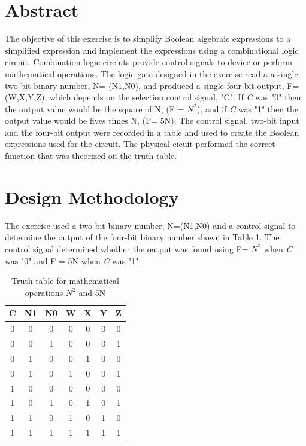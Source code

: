 \documentclass[CMPE]{KGCOEReport}
\begin{document}
\maketitle

\section*{Abstract}
The objective of this exercise is to simplify Boolean algebraic expressions to a simplified expression and implement the expressions using a combinational logic circuit. Combination logic circuits provide control signals to device or perform mathematical operations. The logic gate designed in the exercise read a a single two-bit binary number, N= (N1,N0), and produced a single four-bit output, F=(W,X,Y,Z), which depends on the selection control signal, "C". If \textit{C} was "0" then the output value would be the square of N,  (F = $N^2$), and if \textit{C} was "1" then the output value would be fives times N, (F= 5N). The control signal, two-bit input and the four-bit output were recorded in a table and used to create the Boolean expressions used for the circuit. The physical cicuit performed the correct function that was theorized on the truth table.
\section*{Design Methodology}
The exercise used a two-bit binary number, N=(N1,N0) and a control signal to determine the output of the four-bit binary number shown in Table 1. The control signal determined whether the output was found using F= $N^2$ when \textit{C} was "0" and F = 5N when \textit{C} was "1".
\begin{table}[H]
	\centering
	\caption{Truth table for mathematical operations $N^2$ and 5N}
	\label{tab:Table 1}
	\begin{tabular}{|ccc||cccc|}
		\hline
		C & N1 & N0 & W & X & Y & Z\\ \hline
		0 & 0 & 0 & 0 & 0 & 0 & 0\\ \hline
		0 & 0 & 1 & 0 & 0 & 0 & 1\\ \hline
		0 & 1 & 0 & 0 & 1 & 0 & 0\\ \hline
		0 & 1 & 0 & 1 & 0 & 0 & 1\\ \hline
		1 & 0 & 0 & 0 & 0 & 0 & 0\\ \hline
		1 & 0 & 1 & 0 & 1 & 0 & 1\\ \hline
		1 & 1 & 0 & 1 & 0 & 1 & 0\\ \hline
		1 & 1 & 1 & 1 & 1 & 1 & 1\\
		\hline
	\end{tabular}
\end{table}
\end{document}
